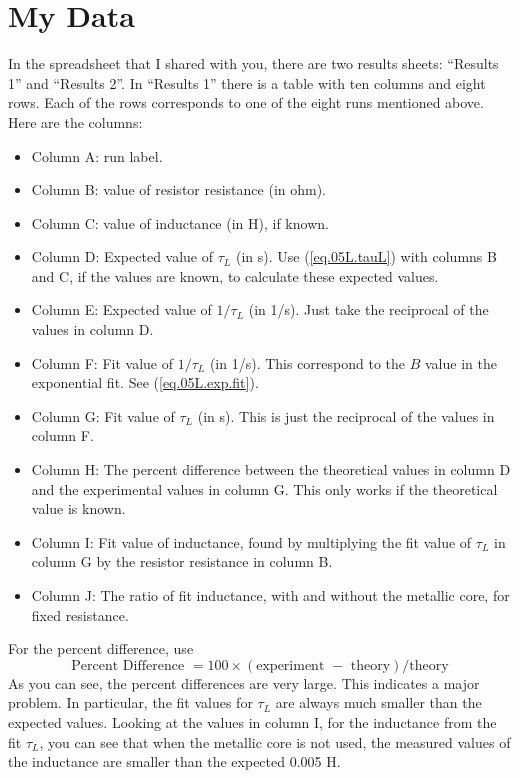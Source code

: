 \section{My Data}
In the spreadsheet that I shared with you, there are two results sheets: ``Results 1'' and ``Results 2''. In ``Results 1'' there is a table with ten columns and eight rows. Each of the rows corresponds to one of the eight runs mentioned above. Here are the columns:
\begin{itemize}
	\item Column A: run label.
	\item Column B: value of resistor resistance (in ohm).
	\item Column C: value of inductance (in H), if known.
	\item Column D: Expected value of $\tau_{L}$ (in s). Use (\ref{eq.05L.tauL}) with columns B and C, if the values are known, to calculate these expected values.
	\item Column E: Expected value of $1 / \tau_{L}$ (in 1/s). Just take the reciprocal of the values in column D.
	\item Column F: Fit value of $1 / \tau_{L}$ (in 1/s). This correspond to the $B$ value in the exponential fit. See (\ref{eq.05L.exp.fit}).
	\item Column G: Fit value of $\tau_{L}$ (in s). This is just the reciprocal of the values in column F.
	\item Column H: The percent difference between the theoretical values in column D and the experimental values in column G. This only works if the theoretical value is known.
	\item Column I: Fit value of inductance, found by multiplying the fit value of $\tau_{L}$ in column G by the resistor resistance in column B.
	\item Column J: The ratio of fit inductance, with and without the metallic core, for fixed resistance.
\end{itemize}
For the percent difference, use
\begin{equation}
	\text{Percent Difference } = 100 \times (\text{experiment } - \text{ theory}) / \text{theory}
\end{equation}
As you can see, the percent differences are very large. This indicates a major problem. In particular, the fit values for $\tau_{L}$ are always much smaller than the expected values. Looking at the values in column I, for the inductance from the fit $\tau_{L}$, you can see that when the metallic core is not used, the measured values of the inductance are smaller than the expected 0.005 H.

